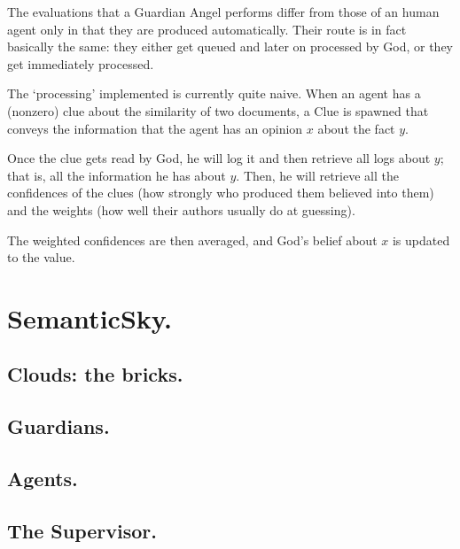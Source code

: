 \documentclass[11pt]{article}
\begin{document}
The evaluations that a Guardian Angel performs differ from those of an human agent only in that they are produced automatically. Their route is in fact basically the same: they either get queued and later on processed by God, or they get immediately processed.

The `processing' implemented is currently quite naive. When an agent has a (nonzero) clue about the similarity of two documents, a Clue is spawned that conveys the information that the agent has an opinion $x$ about the fact $y$.

Once the clue gets read by God, he will log it and then retrieve all logs about $y$; that is, all the information he has about $y$. Then, he will retrieve all the confidences of the clues (how strongly who produced them believed into them) and the weights (how well their authors usually do at guessing).

The weighted confidences are then averaged, and God's belief about $x$ is updated to the value.

\section{SemanticSky.}

\subsection{Clouds: the bricks.}

\subsection{Guardians.}

\subsection{Agents.}

\subsection{The Supervisor.}
\end{document}
